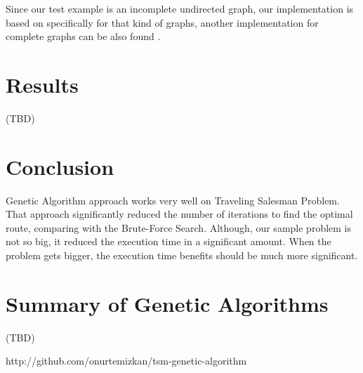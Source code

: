 \documentclass[journal,transmag]{IEEEtran}
\begin{document}
    Since our test example is an incomplete undirected graph, our implementation
    is based on specifically for that kind of graphs, another implementation for
    complete graphs can be also found \cite{code_repository}.

    \section{Results}

    (TBD)

    \section{Conclusion}

    Genetic Algorithm approach works very well on Traveling Salesman Problem.
    That approach significantly reduced the number of iterations to find the
    optimal route, comparing with the Brute-Force Search. Although, our sample
    problem is not so big, it reduced the execution time in a significant
    amount. When the problem gets bigger, the execution time benefits should be
    much more significant.

    \appendices
    \section{Summary of Genetic Algorithms}

    (TBD)

    \ifCLASSOPTIONcaptionsoff
      \newpage
    \fi

    \begin{thebibliography}{1}

    http://github.com/onurtemizkan/tsm-genetic-algorithm
    \end{thebibliography}

    
\end{document}
